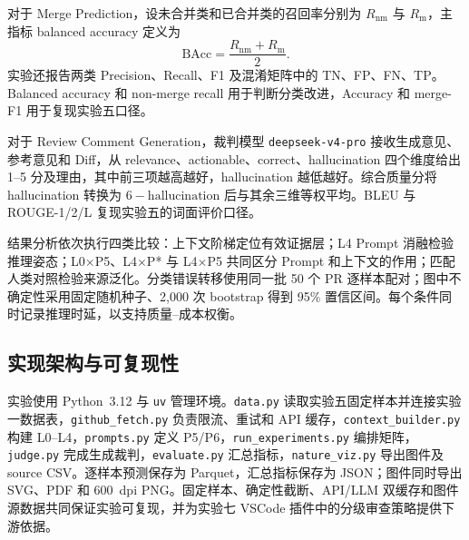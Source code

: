 \documentclass{experimentreport}
\begin{document}
{对于 Merge Prediction，设未合并类和已合并类的召回率分别为 $R_{\mathrm{nm}}$ 与 $R_{\mathrm{m}}$，主指标 balanced accuracy 定义为
\[
\mathrm{BAcc}=\frac{R_{\mathrm{nm}}+R_{\mathrm{m}}}{2}.
\]
实验还报告两类 Precision、Recall、F1 及混淆矩阵中的 TN、FP、FN、TP。Balanced accuracy 和 non-merge recall 用于判断分类改进，Accuracy 和 merge-F1 用于复现实验五口径。

对于 Review Comment Generation，裁判模型 \texttt{deepseek-v4-pro} 接收生成意见、参考意见和 Diff，从 relevance、actionable、correct、hallucination 四个维度给出 1--5 分及理由，其中前三项越高越好，hallucination 越低越好。综合质量分将 hallucination 转换为 $6-\mathrm{hallucination}$ 后与其余三维等权平均。BLEU 与 ROUGE-1/2/L 复现实验五的词面评价口径。

结果分析依次执行四类比较：上下文阶梯定位有效证据层；L4 Prompt 消融检验推理姿态；L0$\times$P5、L4$\times$P* 与 L4$\times$P5 共同区分 Prompt 和上下文的作用；匹配人类对照检验来源泛化。分类错误转移使用同一批 50 个 PR 逐样本配对；图中不确定性采用固定随机种子、2,000 次 bootstrap 得到 95\% 置信区间。每个条件同时记录推理时延，以支持质量--成本权衡。

\subsection{实现架构与可复现性}

实验使用 Python~3.12 与 \texttt{uv} 管理环境。\texttt{data.py} 读取实验五固定样本并连接实验一数据表，\texttt{github\_fetch.py} 负责限流、重试和 API 缓存，\texttt{context\_builder.py} 构建 L0--L4，\texttt{prompts.py} 定义 P5/P6，\texttt{run\_experiments.py} 编排矩阵，\texttt{judge.py} 完成生成裁判，\texttt{evaluate.py} 汇总指标，\texttt{nature\_viz.py} 导出图件及 source CSV。逐样本预测保存为 Parquet，汇总指标保存为 JSON；图件同时导出 SVG、PDF 和 600~dpi PNG。固定样本、确定性截断、API/LLM 双缓存和图件源数据共同保证实验可复现，并为实验七 VSCode 插件中的分级审查策略提供下游依据。

}

\end{document}

